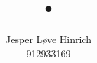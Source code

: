 \documentclass[11pt, a4paper]{article} %
\title{•}
\author{Jesper Løve Hinrich \\ 912933169}
\begin{document}
\theoremstyle{plain}
\newtheorem{theorem}{Theorem}[section]
\newtheorem{lemma}[theorem]{Lemma}
\newtheorem{corollary}[theorem]{Corollary}

\theoremstyle{definition}
\newtheorem{example}{Example}[section]
\newtheorem{defn}{Definition}[section]



\maketitle
\end{document}
